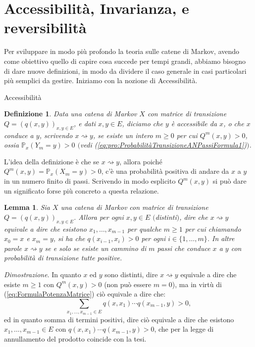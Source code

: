 \documentclass[11pt]{book}
\makeatletter
\theoremstyle{Definizione}
\newtheorem*{mydef}{Definizione}
\theoremstyle{TeoremaProposizioneLemmaCorollario}
\newtheorem{mylem}[myteo]{Lemma}
\theoremstyle{OsservazioneNota}
\renewenvironment{proof}[1][\proofname]{\par
  \normalfont \topsep6\p@\@plus6\p@\relax
  \trivlist
  \item[\hskip\labelsep
        \itshape
    #1\@addpunct{.}]\ignorespaces
}{%
  \endtrivlist\@endpefalse
}
\renewcommand{\P}{\mathbb{P}}
\newcommand{\conduce}{\rightsquigarrow}
\renewenvironment{proof}{\textsl{Dimostrazione}.}{}
\makeatother
\begin{document}
\section{Accessibilità, Invarianza, e reversibilità}
Per sviluppare in modo più profondo la teoria sulle catene di Markov, avendo come obiettivo quello di capire cosa succede per tempi grandi, abbiamo bisogno di dare nuove definizioni, in modo da dividere il caso generale in casi particolari più semplici da gestire. Iniziamo con la nozione di Accessibilità.
\begin{boxdef}{Accessibilità}
\begin{mydef}
Data una catena di Markov $X$ con matrice di transizione $Q = (q(x,y))_{x,y\in E}$, e dati $x,y\in E$, diciamo che $y$ è accessibile da $x$, o che $x$ conduce a $y$, scrivendo $x \conduce y$, se esiste un intero $m \geq 0$ per cui $Q^m(x,y) > 0$, ossia $\P_x(Y_m = y) > 0$ $($vedi \textup{(\ref{eq:pro:ProbabilitàTransizioneANPassiFormula1})}$)$.
\end{mydef}
\end{boxdef}
\noindent
L'idea della definizione è che se $x \conduce y$, allora poiché $Q^m(x,y) = \P_x(X_m = y) > 0$, c'è una probabilità positiva di andare da $x$ a $y$ in un numero finito di passi. Scrivendo in modo esplicito $Q^m(x,y)$ si può dare un significato forse più concreto a questa relazione.
\begin{boxoss}
\begin{mylem}
Sia $X$ una catena di Markov con matrice di transizione $Q = (q(x,y))_{x,y\in E}$. Allora per ogni $x,y\in E$ $($distinti$)$, dire che $x \conduce y$ equivale a dire che esistono $x_1,\dots,x_{m-1}$ per qualche $m \geq 1$ per cui chiamando $x_0 = x$ e $x_m = y$, si ha che $q(x_{i-1},x_i) > 0$ per ogni $i\in \{1,\dots,m\}$. In altre parole $x \conduce y$ se e solo se esiste un cammino di $m$ passi che conduce $x$ a $y$ con probabilità di transizione tutte positive.
\end{mylem}
\tcblower
\begin{proof}
In quanto $x$ ed $y$ sono distinti, dire $ x\conduce y$ equivale a dire che esiste $m \geq 1$ con $Q^m(x,y) > 0$ (non può essere $m = 0$), ma in virtù di (\ref{eq:FormulaPotenzaMatrice}) ciò equivale a dire che:
$$
\sum_{x_1,\dots,x_{m-1}\in E} q(x,x_1)\cdots q(x_{m-1},y) > 0,
$$
ed in quanto somma di termini positivi, dire ciò equivale a dire che esistono $x_1,\dots,x_{m-1}\in E$ con $q(x,x_1)\cdots q(x_{m-1},y) > 0$, che per la legge di annullamento del prodotto coincide con la tesi.
\end{proof}
\end{boxoss}
\end{document}
